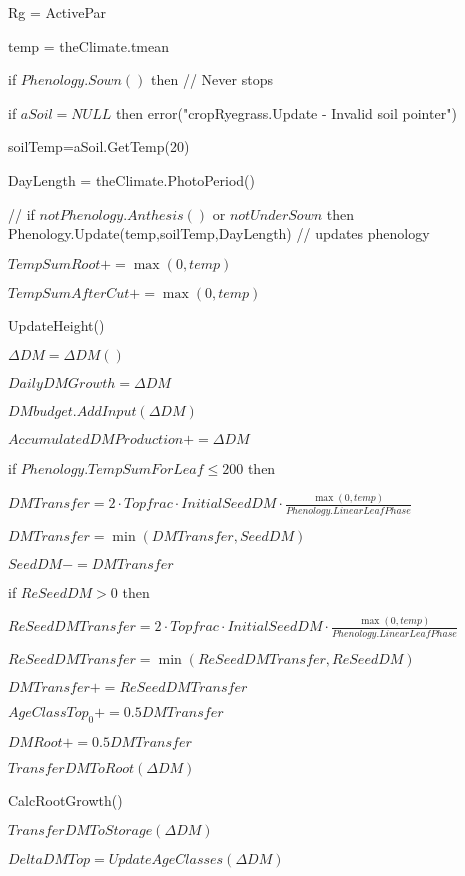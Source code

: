 \documentclass[%
]{scrartcl}
\begin{document}
Rg 	= ActivePar
  
 temp = theClimate.tmean

	if $Phenology.Sown()$ then                            //  Never stops
  
      if $aSoil = NULL$ then
         error("cropRyegrass.Update - Invalid soil pointer")

   	soilTemp=aSoil.GetTemp(20)

      DayLength = theClimate.PhotoPeriod()

 //      if $ not Phenology.Anthesis()$  or  $ not UnderSown$ then
      	Phenology.Update(temp,soilTemp,DayLength)      //  updates phenology


		$TempSumRoot += \max(0,temp)$

     $ TempSumAfterCut += \max(0,temp)$

		UpdateHeight()

     $ \Delta DM=\Delta DM()$

      $DailyDMGrowth = \Delta DM$

   	$DMbudget.AddInput(\Delta DM)  $            

      $AccumulatedDMProduction += \Delta DM$

      if $Phenology.TempSumForLeaf \le 200$ then
     
   \quad        $ DMTransfer=2 \cdot Topfrac \cdot InitialSeedDM \cdot \tfrac{\max(0,temp)}{Phenology.LinearLeafPhase}$
   
 \quad       $ DMTransfer = \min(DMTransfer,SeedDM)$

   \quad        $ SeedDM -= DMTransfer$

   \quad         if $ReSeedDM >0$ then
        
    \quad   \quad        	$ReSeedDMTransfer = 2 \cdot Topfrac \cdot InitialSeedDM 
\cdot \tfrac{\max(0,temp)}{Phenology.LinearLeafPhase}$

    \quad   \quad        	$ReSeedDMTransfer = \min(ReSeedDMTransfer,ReSeedDM)$

     \quad   \quad         $ DMTransfer += ReSeedDMTransfer$

         
   \quad        $ AgeClassTop_0 += 0.5  DMTransfer$

   \quad      $   DMRoot  += 0.5  DMTransfer$
     

      $TransferDMToRoot(\Delta DM)$

      CalcRootGrowth()

      	$TransferDMToStorage(\Delta DM)$

      $DeltaDMTop = UpdateAgeClasses(\Delta DM)$
\end{document}
